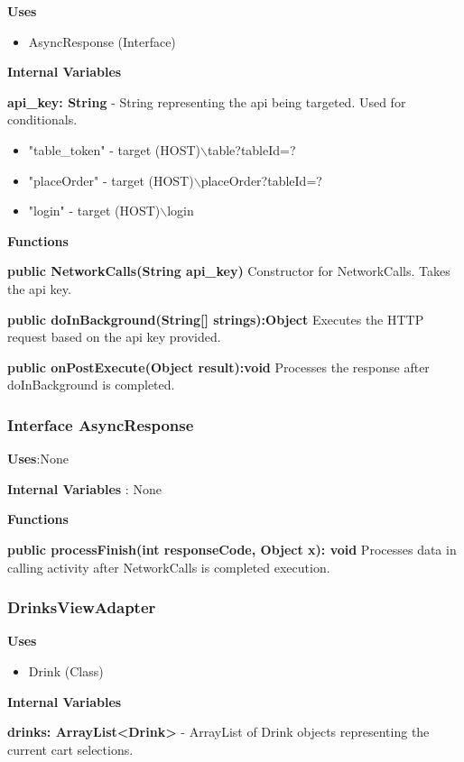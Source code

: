 \documentclass [10pt]{article}
\begin{document}
\textbf{Uses}
\begin{itemize}
	\item AsyncResponse (Interface)
\end{itemize}
\textbf{Internal Variables}

\textbf{api\_key: String} - String representing the api being targeted. Used for conditionals.

\begin{itemize}
	\item "table\_token" - target (HOST)$\backslash$table?tableId=?
	\item "placeOrder" - target (HOST)$\backslash$placeOrder?tableId=?
	\item "login" - target (HOST)$\backslash$login
\end{itemize}

\textbf{Functions}

\textbf{public NetworkCalls(String api\_key)}
Constructor for NetworkCalls. Takes the api key.

\textbf{public doInBackground(String[] strings):Object}
Executes the HTTP request based on the api key provided.

\textbf{public onPostExecute(Object result):void}
Processes the response after doInBackground is completed.

\subsubsection{Interface AsyncResponse}

\textbf{Uses}:None

\textbf{Internal Variables} : None

\textbf{Functions}

\textbf{public processFinish(int responseCode, Object x): void}
Processes data in calling activity after NetworkCalls is completed execution.

\subsubsection{DrinksViewAdapter}

\textbf{Uses}

\begin{itemize}
	\item Drink (Class)
\end{itemize}

\textbf{Internal Variables}

\textbf{drinks: ArrayList<Drink>} - ArrayList of Drink objects representing the current cart selections.
\end{document}
